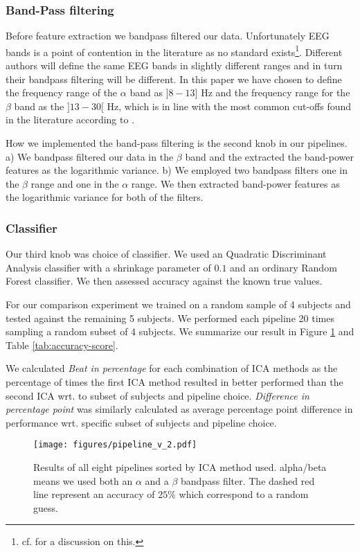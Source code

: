 	\subsubsection{Band-Pass filtering} Before feature extraction we bandpass filtered our data. Unfortunately EEG bands is a point of contention in the literature as no standard exists\footnote{cf. \cite{newson2019} for a discussion on this.}. Different authors will define the same EEG bands in slightly different ranges and in turn their bandpass filtering will be different. In this paper we have chosen to define the frequency range of the $\alpha$ band as $]8-13]$ Hz and the frequency range for the $\beta$ band as the $]13-30[$ Hz, which is in line with the most common cut-offs found in the literature according to \cite{newson2019}. 

	How we implemented the band-pass filtering is the second knob in our pipelines. a) We bandpass filtered our data in the $\beta$ band and the extracted the band-power features as the logarithmic variance. b) We employed two bandpass filters one in the $\beta$ range and one in the $\alpha$ range. We then extracted band-power features as the logarithmic variance for both of the filters. 

	\subsubsection{Classifier} Our third knob was choice of classifier. We used an Quadratic Discriminant Analysis classifier with a shrinkage parameter of $0.1$ and an ordinary Random Forest classifier. We then assessed accuracy against the known true values.

	For our comparison experiment we trained on a random sample of 4 subjects and tested against the remaining 5 subjects. We performed each pipeline 20 times sampling a random subset of 4 subjects. We summarize our result in Figure \ref{fig:pipeline_result} and Table \ref{tab:accuracy-score}.

	We calculated \textit{Beat in percentage} for each combination of ICA methods as the percentage of times the first ICA method resulted in better performed than the second ICA wrt. to subset of subjects and pipeline choice. \textit{Difference in percentage point} was similarly calculated as average percentage point difference in performance wrt. specific subset of subjects and pipeline choice.

	\begin{figure}
		\center
			\texttt{[image: figures/pipeline\_v\_2.pdf]}
			\caption{Results of all eight pipelines sorted by ICA method used. alpha/beta means we used both an $\alpha$ and a $\beta$ bandpass filter. The dashed red line represent an accuracy of $25\%$ which correspond to a random guess.}
		\label{fig:pipeline_result}
	\end{figure}

